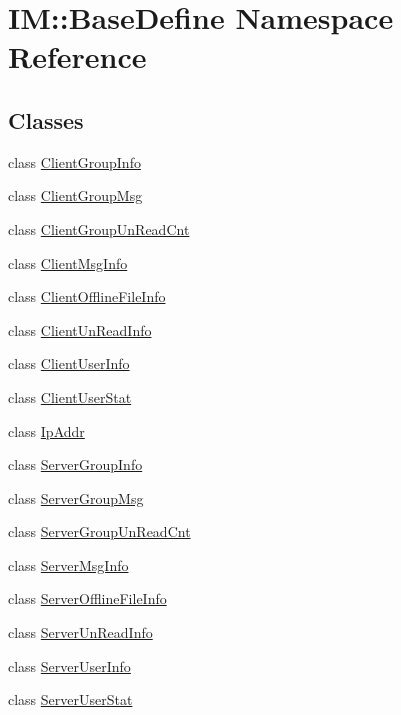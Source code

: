 \hypertarget{namespace_i_m_1_1_base_define}{}\section{I\+M\+:\+:Base\+Define Namespace Reference}
\label{namespace_i_m_1_1_base_define}
\subsection*{Classes}
\begin{DoxyCompactItemize}
\item 
class \hyperlink{class_i_m_1_1_base_define_1_1_client_group_info}{Client\+Group\+Info}
\item 
class \hyperlink{class_i_m_1_1_base_define_1_1_client_group_msg}{Client\+Group\+Msg}
\item 
class \hyperlink{class_i_m_1_1_base_define_1_1_client_group_un_read_cnt}{Client\+Group\+Un\+Read\+Cnt}
\item 
class \hyperlink{class_i_m_1_1_base_define_1_1_client_msg_info}{Client\+Msg\+Info}
\item 
class \hyperlink{class_i_m_1_1_base_define_1_1_client_offline_file_info}{Client\+Offline\+File\+Info}
\item 
class \hyperlink{class_i_m_1_1_base_define_1_1_client_un_read_info}{Client\+Un\+Read\+Info}
\item 
class \hyperlink{class_i_m_1_1_base_define_1_1_client_user_info}{Client\+User\+Info}
\item 
class \hyperlink{class_i_m_1_1_base_define_1_1_client_user_stat}{Client\+User\+Stat}
\item 
class \hyperlink{class_i_m_1_1_base_define_1_1_ip_addr}{Ip\+Addr}
\item 
class \hyperlink{class_i_m_1_1_base_define_1_1_server_group_info}{Server\+Group\+Info}
\item 
class \hyperlink{class_i_m_1_1_base_define_1_1_server_group_msg}{Server\+Group\+Msg}
\item 
class \hyperlink{class_i_m_1_1_base_define_1_1_server_group_un_read_cnt}{Server\+Group\+Un\+Read\+Cnt}
\item 
class \hyperlink{class_i_m_1_1_base_define_1_1_server_msg_info}{Server\+Msg\+Info}
\item 
class \hyperlink{class_i_m_1_1_base_define_1_1_server_offline_file_info}{Server\+Offline\+File\+Info}
\item 
class \hyperlink{class_i_m_1_1_base_define_1_1_server_un_read_info}{Server\+Un\+Read\+Info}
\item 
class \hyperlink{class_i_m_1_1_base_define_1_1_server_user_info}{Server\+User\+Info}
\item 
class \hyperlink{class_i_m_1_1_base_define_1_1_server_user_stat}{Server\+User\+Stat}
\end{DoxyCompactItemize}
